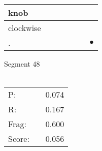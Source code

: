 \documentclass[landscape]{article}
\newcommand{\ssp}{\hspace{2pt}}
\newcommand{\mex}{\cellcolor{g}$\bullet$}
\begin{document}
\begin{tabular}{|l|p{10pt}|p{10pt}|p{10pt}|p{10pt}|p{10pt}|p{10pt}|}
\hline
\ssp knob \ssp&\hspace{2pt}&\hspace{2pt}&\hspace{2pt}&\hspace{2pt}&\hspace{2pt}&\hspace{2pt}\\
\hline
\ssp clockwise \ssp&\hspace{2pt}&\hspace{2pt}&\hspace{2pt}&\hspace{2pt}&\hspace{2pt}&\hspace{2pt}\\
\hline
\ssp \cellcolor{ref5}. \ssp&\hspace{2pt}&\hspace{2pt}&\hspace{2pt}&\hspace{2pt}&\hspace{2pt}&\hspace{2pt}\mex\\
\hline
\end{tabular}

\vspace{6pt}
\noindent Segment 48\\\\
\noindent\begin{tabular}{lm{12pt}r}
\hline
P:&&0.074\\
R:&&0.167\\
Frag:&&0.600\\
Score:&&0.056\\
\end{tabular}

\newpage
\end{document}
